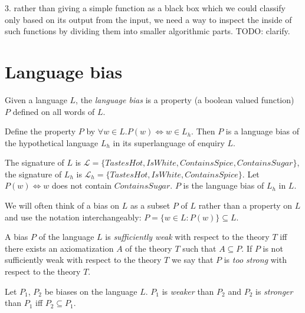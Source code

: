 3. rather than giving a simple function as a black box which we could classify only based on its output from the input, we need a way to inspect the inside of such functions by dividing them into smaller algorithmic parts.
TODO: clarify.

\section{Language bias}
\begin{defn}
Given a language $L$, the \emph{language bias} is a property (a boolean valued function) $P$ defined on all words of $L$.
\end{defn}

\begin{exmp}
Define the property $P$ by $\forall w \in L. P(w) \iff w \in L_h$. Then $P$ is a language bias of the hypothetical language $L_h$ in its superlanguage of enquiry $L$.
\end{exmp}

\begin{exmp}
The signature of $L$ is
$\mathcal{L}=\{TastesHot, IsWhite, ContainsSpice, ContainsSugar\}$,
the signature of $L_h$ is
$\mathcal{L}_h=\{TastesHot, IsWhite, ContainsSpice\}$.
Let $P(w) \iff w$ does not contain $ContainsSugar$. $P$ is the language bias of $L_h$ in $L$.
\end{exmp}

\begin{remark}
We will often think of a bias on $L$ as a subset $P$ of $L$ rather than a property on $L$ and use the notation interchangeably:
$P=\{w \in L : P(w)\} \subseteq L$.
\end{remark}

\begin{defn}
A bias $P$ of the language $L$ is \emph{sufficiently weak} with respect to the theory $T$ iff there exists an axiomatization $A$ of the theory $T$ such that $A \subseteq P$. If $P$ is not sufficiently weak with respect to the theory $T$ we say that $P$ is \emph{too strong} with respect to the theory $T$.
\end{defn}

\begin{defn}
Let $P_1$, $P_2$ be biases on the language $L$. $P_1$ is \emph{weaker} than $P_2$ and $P_2$ is \emph{stronger} than $P_1$ iff $P_2 \subseteq P_1$.
\end{defn}

